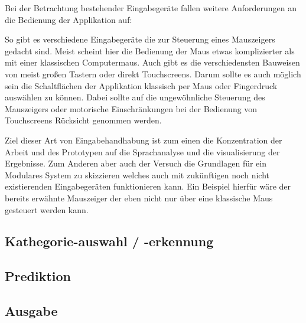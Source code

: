         Bei der Betrachtung bestehender Eingabegeräte fallen weitere Anforderungen an die Bedienung der Applikation auf:
        
        So gibt es verschiedene Eingabegeräte die zur Steuerung eines Mauszeigers gedacht sind. Meist scheint hier die Bedienung der Maus etwas komplizierter als mit einer klassischen Computermaus. Auch gibt es die verschiedensten Bauweisen von meist großen Tastern oder direkt Touchscreens. Darum sollte es auch möglich sein die Schaltflächen der Applikation klassisch per Maus oder Fingerdruck auswählen zu können. Dabei sollte auf die ungewöhnliche Steuerung des Mauszeigers oder motorische Einschränkungen bei der Bedienung von Touchscreens Rücksicht genommen werden. 
        
        Ziel dieser Art von Eingabehandhabung ist zum einen die Konzentration der Arbeit und des Prototypen auf die Sprachanalyse und die visualisierung der Ergebnisse. Zum Anderen aber auch der Versuch die Grundlagen für ein Modulares System zu skizzieren welches auch mit zukünftigen noch nicht existierenden Eingabegeräten funktionieren kann. Ein Beispiel hierfür wäre der bereits erwähnte Mauszeiger der eben nicht nur über eine klassische Maus gesteuert werden kann.
        \newpage
	\subsection{Kathegorie-auswahl / -erkennung}
	\subsection{Prediktion}
	\subsection{Ausgabe}